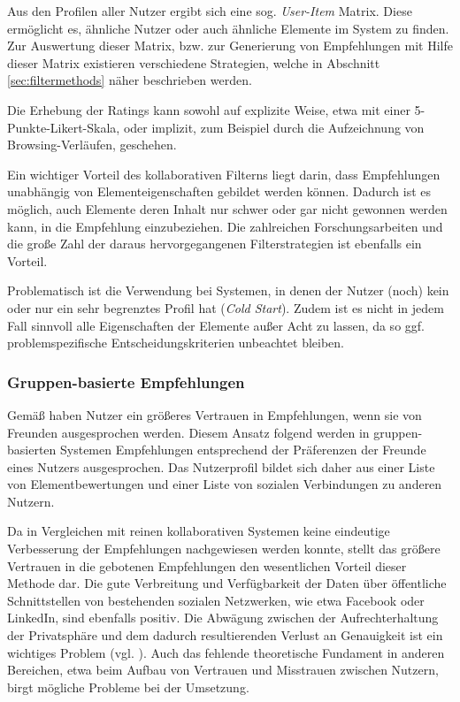 Aus den Profilen aller Nutzer ergibt sich eine sog. \textit{User-Item} Matrix. Diese ermöglicht es, ähnliche Nutzer oder auch ähnliche Elemente im System zu finden. Zur Auswertung dieser Matrix, bzw. zur Generierung von Empfehlungen mit Hilfe dieser Matrix existieren verschiedene Strategien, welche in Abschnitt \ref{sec:filtermethods} näher beschrieben werden.

Die Erhebung der Ratings kann sowohl auf explizite Weise, etwa mit einer 5-Punkte-Likert-Skala, oder implizit, zum Beispiel durch die Aufzeichnung von Browsing-Verläufen, geschehen.

Ein wichtiger Vorteil des kollaborativen Filterns liegt darin, dass Empfehlungen unabhängig von Elementeigenschaften gebildet werden können. Dadurch ist es möglich, auch Elemente deren Inhalt nur schwer oder gar nicht gewonnen werden kann, in die Empfehlung einzubeziehen. Die zahlreichen Forschungsarbeiten und die große Zahl der daraus hervorgegangenen Filterstrategien ist ebenfalls ein Vorteil.

Problematisch ist die Verwendung bei Systemen, in denen der Nutzer (noch) kein oder nur ein sehr begrenztes Profil hat (\textit{Cold Start}). Zudem ist es nicht in jedem Fall sinnvoll alle Eigenschaften der Elemente außer Acht zu lassen, da so ggf. problemspezifische Entscheidungskriterien unbeachtet bleiben.  \citep{hb,Burke:2002:HRS:586321.586352} %

\subsubsection{Gruppen-basierte Empfehlungen}\label{sec:cbf_overview}
Gemäß \citep{SinhaS01} haben Nutzer ein größeres Vertrauen in Empfehlungen, wenn sie von Freunden ausgesprochen werden. Diesem Ansatz folgend werden in gruppen-basierten Systemen Empfehlungen entsprechend der Präferenzen der Freunde eines Nutzers ausgesprochen. Das Nutzerprofil bildet sich daher aus einer Liste von Elementbewertungen und einer Liste von sozialen Verbindungen zu anderen Nutzern.

Da in Vergleichen mit reinen kollaborativen Systemen keine eindeutige Verbesserung der Empfehlungen nachgewiesen werden konnte, stellt das größere Vertrauen in die gebotenen Empfehlungen den wesentlichen Vorteil dieser Methode dar. Die gute Verbreitung und Verfügbarkeit der Daten über öffentliche Schnittstellen von  bestehenden sozialen Netzwerken, wie etwa Facebook oder LinkedIn, sind ebenfalls positiv. Die Abwägung zwischen der Aufrechterhaltung der Privatsphäre und dem dadurch resultierenden Verlust an Genauigkeit ist ein wichtiges Problem (vgl. \citep{machanavajjhala:accurate}). Auch das fehlende theoretische Fundament in anderen Bereichen, etwa beim Aufbau von Vertrauen und Misstrauen zwischen Nutzern, birgt mögliche Probleme bei der Umsetzung. \citep{hb_20}

